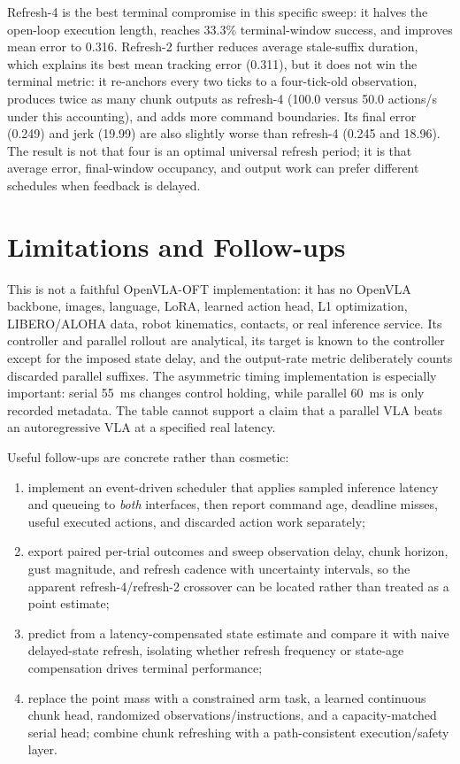 \documentclass[11pt]{article}
\begin{document}
Refresh-4 is the best terminal compromise in this specific sweep: it halves the open-loop execution length, reaches 33.3\% terminal-window success, and improves mean error to 0.316. Refresh-2 further reduces average stale-suffix duration, which explains its best mean tracking error (0.311), but it does not win the terminal metric: it re-anchors every two ticks to a four-tick-old observation, produces twice as many chunk outputs as refresh-4 (100.0 versus 50.0 actions/s under this accounting), and adds more command boundaries. Its final error (0.249) and jerk (19.99) are also slightly worse than refresh-4 (0.245 and 18.96). The result is not that four is an optimal universal refresh period; it is that average error, final-window occupancy, and output work can prefer different schedules when feedback is delayed.

\section{Limitations and Follow-ups}

This is not a faithful OpenVLA-OFT implementation: it has no OpenVLA backbone, images, language, LoRA, learned action head, L1 optimization, LIBERO/ALOHA data, robot kinematics, contacts, or real inference service. Its controller and parallel rollout are analytical, its target is known to the controller except for the imposed state delay, and the output-rate metric deliberately counts discarded parallel suffixes. The asymmetric timing implementation is especially important: serial 55~ms changes control holding, while parallel 60~ms is only recorded metadata. The table cannot support a claim that a parallel VLA beats an autoregressive VLA at a specified real latency.

Useful follow-ups are concrete rather than cosmetic:
\begin{enumerate}[leftmargin=1.5em]
  \item implement an event-driven scheduler that applies sampled inference latency and queueing to \emph{both} interfaces, then report command age, deadline misses, useful executed actions, and discarded action work separately;
  \item export paired per-trial outcomes and sweep observation delay, chunk horizon, gust magnitude, and refresh cadence with uncertainty intervals, so the apparent refresh-4/refresh-2 crossover can be located rather than treated as a point estimate;
  \item predict from a latency-compensated state estimate and compare it with naive delayed-state refresh, isolating whether refresh frequency or state-age compensation drives terminal performance;
  \item replace the point mass with a constrained arm task, a learned continuous chunk head, randomized observations/instructions, and a capacity-matched serial head; combine chunk refreshing with a path-consistent execution/safety layer.
\end{enumerate}
\end{document}
